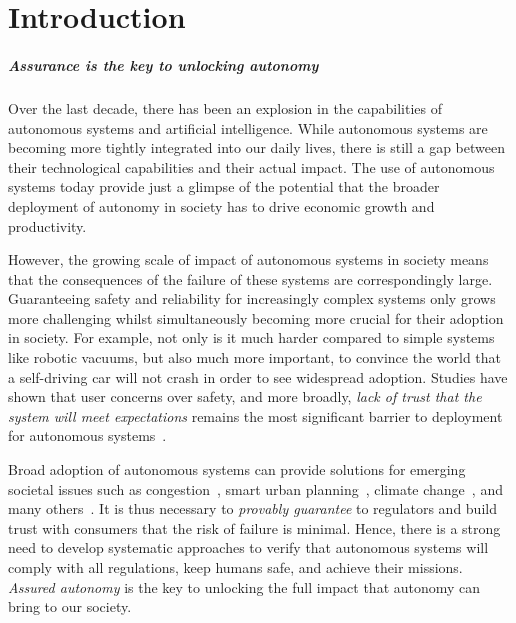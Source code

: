 \chapter{Introduction}

\paragraph{Assurance is the key to unlocking autonomy} Over the last decade, there has been an explosion in the capabilities of autonomous systems and artificial intelligence. While autonomous systems are becoming more tightly integrated into our daily lives, there is still a gap between their technological capabilities and their actual impact. The use of autonomous systems today provide just a glimpse of the potential that the broader deployment of autonomy in society has to drive economic growth and productivity. 



However, the growing scale of impact of autonomous systems in society means that the consequences of the failure of these systems are correspondingly large. Guaranteeing safety and reliability for increasingly complex systems only grows more challenging whilst simultaneously becoming more crucial for their adoption in society. For example, not only is it much harder compared to simple systems like robotic vacuums, but also much more important, to convince the world that a self-driving car will not crash in order to see widespread adoption. Studies have shown that user concerns over safety, and more broadly, \emph{lack of trust that the system will meet expectations} remains the most significant barrier to deployment for autonomous systems~\cite{KAUR201887,BEZAI202165,MOLNAR2018319}.  


Broad adoption of autonomous systems can provide solutions for emerging societal issues such as congestion~\cite{LIORIS2017292,8734238}, smart urban planning~\cite{GULSRUD201885,NITOSLAWSKI2019101770}, climate change~\cite{KOLOKOTSA2017101,goddard2021global}, and many others~\cite{DUONG2020355}. It is thus necessary to \emph{provably guarantee} to regulators and build trust with consumers that the risk of failure is minimal. Hence, there is a strong need to develop systematic approaches to verify that autonomous systems will comply with all regulations, keep humans safe, and achieve their missions. \emph{Assured autonomy} is the key to unlocking the full impact that autonomy can bring to our society. 






